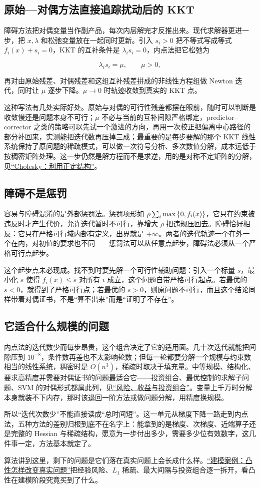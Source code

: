 \subsection{原始---对偶方法直接追踪扰动后的 KKT}

障碍方法把对偶变量当作副产品，每次内层解完才反推出来。现代求解器更进一步，把 \(x,\lambda\) 和松弛变量放在一起同时更新。引入 \(s_i>0\) 把不等式写成等式 \(f_i(x)+s_i=0\)，KKT 的互补条件是 \(\lambda_is_i=0\)，内点法把它松弛为

\[
\lambda_is_i=\mu,\qquad \mu>0,
\]

再对由原始残差、对偶残差和这组互补残差拼成的非线性方程组做 Newton 迭代，同时让 \(\mu\) 逐步下降。\(\mu\to0\) 时轨迹收敛到真实的 KKT 点。

这种写法有几处实际好处。原始与对偶的可行性残差都摆在眼前，随时可以判断是收敛慢还是问题本身不可行；\(\mu\) 不必与当前的互补间隙严格绑定，predictor--corrector 之类的策略可以先试一个激进的方向，再用一次校正把偏离中心路径的部分补回来，实测能把迭代数再压掉三成；最重要的是每步要解的那个 KKT 线性系统保持了原问题的稀疏模式，可以做一次符号分析、多次数值分解，成本远低于按稠密矩阵处理。这一步仍然是解方程而不是求逆，用的是对称不定矩阵的分解，见\hyperref[sec:08-Numerical-Analysis/05-Numerical-Linear-Algebra/03]{``Cholesky：利用正定结构''}。

\subsection{障碍不是惩罚}

容易与障碍混淆的是外部惩罚法。惩罚项形如 \(\rho\sum_i\max\left\{0,f_i(x)\right\}\)，它只在约束被违反时才产生代价，允许迭代暂时不可行，靠增大 \(\rho\) 把违规压回去。障碍恰好相反：它只在严格可行域内部有定义，出界就是 \(+\infty\)。两者的迭代轨迹一个在外一个在内，对初值的要求也不同——惩罚法可以从任意点起步，障碍法必须从一个严格可行点起步。

这个起步点未必现成。找不到时要先解一个可行性辅助问题：引入一个标量 \(s\)，最小化 \(s\) 使得 \(f_i(x)\le s\) 对所有 \(i\) 成立，这个问题自带严格可行起点。若最优的 \(s<0\)，就得到了严格可行点；若最优的 \(s>0\)，则原问题不可行，而且这个结论同样带着对偶证书，不是``算不出来''而是``证明了不存在''。

\subsection{它适合什么规模的问题}

内点法的迭代数少而每步昂贵，这个组合决定了它的适用面。几十次迭代就能把间隙压到 \(10^{-8}\)，条件数再差也不太影响轮数；但每一轮都要分解一个规模与约束数相当的线性系统，稠密时是 \(O(n^3)\)，稀疏时取决于填充量。中等规模、结构化、要求高精度并需要对偶证书的问题最适合它——投资组合、最优控制的求解子问题、SVM 的对偶形式都属此列，见\hyperref[sec:09-Convex-Optimization/07-Applications/04]{``风险、收益与投资组合''}。变量上千万时分解本身就装不下内存，那时该退回一阶方法或做问题分解，用精度换规模。

所以``迭代次数少''不能直接读成``总时间短''。这一单元从梯度下降一路走到内点法，五种方法的差别归根到底不在名字上：能拿到的是梯度、次梯度、近端算子还是完整的 Hessian 与稀疏结构，愿意为一步付出多少，需要多少位有效数字，这几件事一定，方法基本就定了。

算法讲到这里，剩下的问题是它们落在真实问题上会长成什么样。\hyperref[ch:077]{``建模案例：凸性怎样改变真实问题''}把经验风险、\(L_1\) 稀疏、最大间隔与投资组合逐一拆开，看凸性在建模阶段究竟买到了什么。
